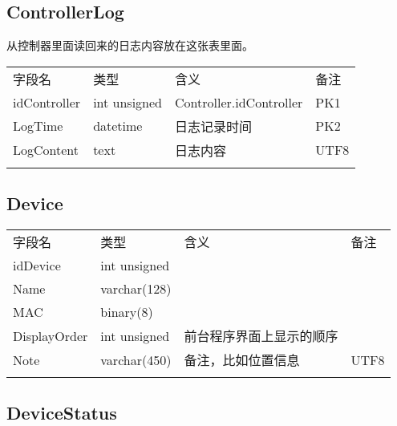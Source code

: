 \subsection{ControllerLog}\label{controllerlog}

从控制器里面读回来的日志内容放在这张表里面。

\begin{longtabu}[c]{@{}lXXX@{}}
\toprule\addlinespace
字段名 & 类型 & 含义 & 备注
\\\addlinespace
\midrule\endhead
idController & int unsigned & Controller.idController & PK1
\\\addlinespace
LogTime & datetime & 日志记录时间 & PK2
\\\addlinespace
LogContent & text & 日志内容 & UTF8
\\\addlinespace
\bottomrule
\end{longtabu}

\subsection{Device}\label{device}

\begin{longtabu}[c]{@{}lXXX@{}}
\toprule\addlinespace
字段名 & 类型 & 含义 & 备注
\\\addlinespace
\midrule\endhead
idDevice & int unsigned & &
\\\addlinespace
Name & varchar(128) & &
\\\addlinespace
MAC & binary(8) & &
\\\addlinespace
DisplayOrder & int unsigned & 前台程序界面上显示的顺序 &
\\\addlinespace
Note & varchar(450) & 备注，比如位置信息 & UTF8
\\\addlinespace
\bottomrule
\end{longtabu}

\subsection{DeviceStatus}\label{devicestatus}

